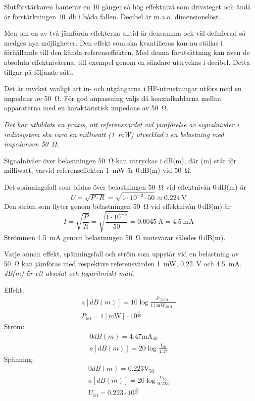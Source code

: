 Slutförstärkaren hanterar en 10 gånger så hög effektnivå som drivsteget och ändå
är förstärkningen \SI{10}{\decibel} i båda fallen.
Decibel är m.a.o. dimensionslöst.

Men om en av två jämförda effekterna alltid är densamma och väl
definierad så medges nya möjligheter. Den effekt som ska
kvantifieras kan nu ställas i förhållande till den kända
referenseffekten. Med denna förutsättning kan även de absoluta
effektnivåerna, till exempel genom en sändare uttryckas i decibel. Detta
tillgår på följande sätt.

Det är mycket vanligt att in- och utgångarna i HF-utrustningar utförs
med en impedans av \SI{50}{\ohm}.
För god anpassning väljs då koaxialkablarna mellan apparaterna med en
karaktäristisk impedans av \SI{50}{\ohm}.

\emph{Det har utbildats en praxis, att referensvärdet vid jämförelse
  av signalnivåer i radiosystem ska vara en milliwatt (\SI{1}{\milli\watt})
  utvecklad i en belastning med impedansen \SI{50}{\ohm}.}

Signalnivåer över belastningen \SI{50}{\ohm} kan uttryckas i dB(m), där (m)
står för milliwatt, varvid referenseffekten \SI{1}{\milli\watt} är 0\,dB(m) vid
\SI{50}{\ohm}.

Det spänningsfall som bildas över belastningen \SI{50}{\ohm} vid effektnivån
0\,dB(m) är
\[U = \sqrt{P\cdot R} = \sqrt{1\cdot 10^{-3} \cdot 50} \approx \SI{0.224}{\volt}\]
Den ström som flyter genom belastningen \SI{50}{\ohm} vid effektnivån 0\,dB(m)
är
\[
I = \sqrt{\frac{P}{R}} = \sqrt{\frac{1\cdot 10^{-3}}{50}} = \SI{0.0045}{\ampere} = \SI{4.5}{\milli\ampere}
\]
Strömmen \SI{4,5}{\milli\ampere} genom belastningen \SI{50}{\ohm} motsvarar
således 0\,dB(m).

Varje annan effekt, spänningsfall och ström som uppstår vid en belastning av
\SI{50}{\ohm} kan jämföras med respektive referensvärden \SI{1}{\milli\watt},
\SI{0,22}{\volt} och \SI{4,5}{\milli\ampere}.
\emph{dB(m) är ett absolut och logaritmiskt mått.}

\noindent
Effekt:
\begin{gather*}
  a [dB(m)] = 10 \log\frac{P_{[\SI{50}{\ohm}]}}{1[\si{\milli\watt}_{\SI{50}{\ohm}}]} \\
  P_{50} = 1 [\si{\milli\watt}] \cdot 10^{\frac{a}{10}}
\end{gather*}
Ström:
\begin{gather*}
  0 dB(m) = 4.47 \si{\milli\ampere}_{50} \\
  a [dB(m)] = 20 \log\frac{I_{50}}{4.47}
\end{gather*}
Spänning:
\begin{gather*}
  0 dB(m) = 0.223 \si{\volt}_{50} \\
  a [dB(m)] = 20 \log\frac{U_{50}}{0.223} \\
  U_{50} = 0.223 \cdot 10^{\frac{a}{20}}
\end{gather*}

